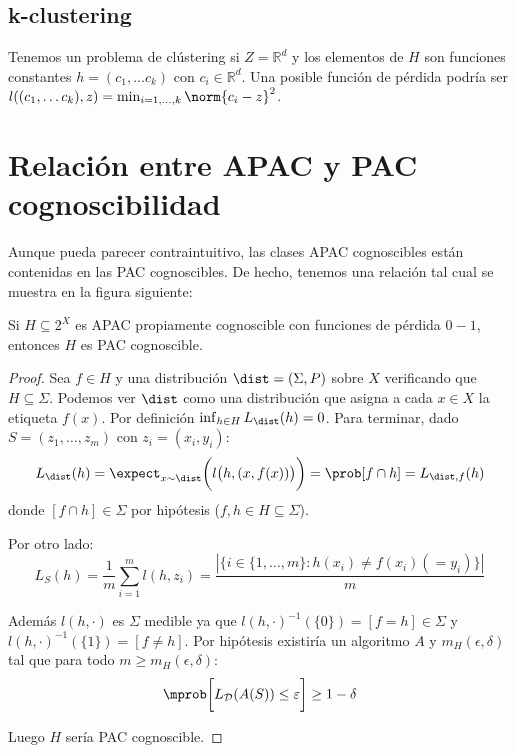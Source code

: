 \subsection{k-clustering}
Tenemos un problema de clústering si $Z=\mathbb{R}^d$ y los elementos de $H$ son funciones constantes 
$h = (c_1, \ldots c_k)$ con $c_i \in \mathbb{R}^d$. Una posible función de pérdida podría ser 
$l((c_1, \ldots c_k), z) = \min_{i=1,\ldots, k} \norm{c_i - z}^2$.


\section{Relación entre APAC y PAC cognoscibilidad}
Aunque pueda parecer contraintuitivo, las clases APAC cognoscibles están contenidas en las PAC cognoscibles. De hecho, 
tenemos una relación tal cual se muestra en la figura siguiente:


\begin{fact}
 Si $H\subseteq 2^X$ es APAC propiamente cognoscible con funciones de pérdida $0-1$, entonces $H$ es PAC cognoscible.
\end{fact}

  \begin{proof}
   Sea $f\in H$ y una distribución $\dist=(\Sigma,P)$ sobre $X$ verificando que $H\subseteq \Sigma$. Podemos ver 
   $\dist$ como una distribución que asigna a cada $x\in X$ la etiqueta $f(x)$. Por definición $\inf_{h\in H} L_{\dist}(h) = 0$. 
   Para terminar, dado $S=(z_1, \ldots, z_m)$ con $z_i = (x_i,y_i)$:
   \[
     L_{\dist}(h) = \expect_{x\sim \dist}\bigg(l \big(h,(x,f(x)) \big)\bigg) = \prob[f \cap h] = L_{\dist,f}(h)
   \]
   donde $[f\cap h] \in \Sigma$ por hipótesis ($f,h\in H \subseteq \Sigma$).
   
   Por otro lado:
   \[
     L_{S}(h) = \frac{1}{m} \sum_{i=1}^m l(h,z_i) = \frac{|\{i\in\{1,\ldots, m\}: h(x_i) \neq f(x_i)(= y_i)\}|}{m}
   \]
   
   Además $l(h,\cdot)$ es $\Sigma$ medible ya que $l(h, \cdot)^{-1}(\{0\}) = [f = h] \in \Sigma$ y 
   $l(h, \cdot)^{-1}(\{1\}) = [f\neq h]$. Por hipótesis existiría un algoritmo $A$ y $m_H(\epsilon, \delta)$
   tal que para todo $m\ge m_H(\epsilon, \delta)$:
   \[
     \mprob \bigg[L_{\mathcal{D}}(A(S)) \le \varepsilon \bigg] \ge 1-\delta
   \]
   
   Luego $H$ sería PAC cognoscible.
  \end{proof}